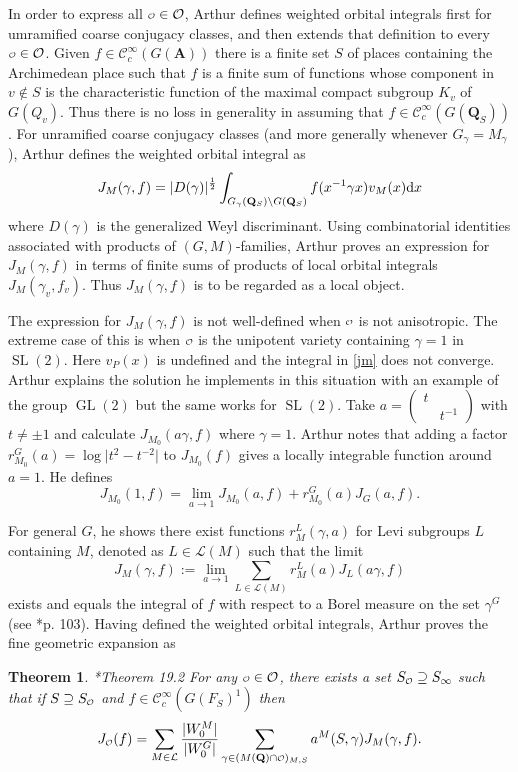 \documentclass[11pt]{amsart}
\def\A{\mathbf A}
\def\Q{\mathbf Q}
\def\CCC{\mathcal C}
\def\LLL{\mathcal L}
\def\O{\mathcal O}
\def\o{\scalebox{0.8}{$\scriptstyle\mathcal{O}$}}
\def\cb#1{{\color{blue}#1}}
\def\d{\text d}
\def\bs{\setminus} 			%
\def\gl{\operatorname{GL}}
\def\mod#1{\lvert #1 \rvert} %
\def\sl{\operatorname{SL}}
\newtheorem{theorem}{Theorem}[section]
\theoremstyle{remark}
\begin{document}
In order to express all $\o \in \O$, Arthur defines weighted orbital integrals first for umramified coarse conjugacy classes, and then extends that definition to every $\o \in \O$. Given $f \in \CCC_c^\infty(G(\A))$ there is a finite set $S$ of places containing the Archimedean place such that $f$ is a finite sum of functions whose component in $v \not \in S$ is the characteristic function of the maximal compact subgroup $K_v$ of $G(Q_v)$. Thus there is no loss in generality in assuming that $f \in \CCC_c^\infty(G(\Q_S))$. For unramified coarse conjugacy classes (and more generally whenever $G_\gamma = M_\gamma$), Arthur defines the weighted orbital integral as 
\begin{equation} \label{jm}
	J_M(\gamma, f) = \mod{D(\gamma)}^{\frac{1}{2}} \int_{G_\gamma(\Q_S)\bs G(\Q_S)} f(x^{-1}\gamma x) v_M(x) \d x
\end{equation}
where $D(\gamma)$ is the generalized Weyl discriminant. Using combinatorial identities associated with products of $(G, M)$-families, Arthur proves an expression for $J_M(\gamma, f)$ in terms of finite sums of products of local orbital integrals $J_M(\gamma_v, f_v)$. Thus $J_M(\gamma, f)$ is to be regarded as a local object. 

The expression for $J_M(\gamma, f)$ is not well-defined when $\o$ is not anisotropic. The extreme case of this is when $\o$ is the unipotent variety containing $\gamma = 1$ in $\sl(2)$. Here $v_P(x)$ is undefined and the integral in \cref{jm} does not converge. Arthur explains the solution he implements in this situation with an example of the group $\gl(2)$ but the same works for $\sl(2)$. \cb{Take $a = \begin{pmatrix} t & \\ & t^{-1} \end{pmatrix}$ with $t \neq \pm 1$ and calculate $J_{M_0}(a\gamma, f)$ where $\gamma = 1$. Arthur notes that adding a factor $r_{M_0}^G(a) = \log \mod{t^2 - t^{-2}}$ to $J_{M_0}(f)$ gives a locally integrable function around $a=1$. He defines
\[ J_{M_0}(1, f) = \lim_{a \to 1} J_{M_0}(a, f) + r_{M_0}^G(a) J_G(a, f). \]
}

For general $G$, he shows there exist functions $r_M^L(\gamma, a)$ for Levi subgroups $L$ containing $M$, denoted as $L \in \LLL(M)$ such that the limit
\[ J_M(\gamma, f) := \lim_{a \to 1} \sum_{L \in \LLL(M)} r_M^L(a) J_L(a\gamma, f) \]
exists and equals the integral of $f$ with respect to a Borel measure on the set $\gamma^G$ (see \cite{clay}*{p. 103}). Having defined the weighted orbital integrals, Arthur proves the fine geometric expansion as
\begin{theorem} \cite{clay}*{Theorem 19.2}
	For any $\o \in \O$, there exists a set $S_{\o} \supseteq S_\infty$ such that if $S \supseteq S_{\o}$ and $f \in \CCC_c^\infty(G(F_S)^1)$ then
	\[ J_{\o}(f) = \sum_{M \in \LLL} \frac{\mod{W_0^M}}{\mod{W_0^G}} \sum_{\gamma \in (M(\Q)\cap \o)_{M, S}}
			a^M(S, \gamma) J_M(\gamma, f). \]
\end{theorem}
\end{document}
